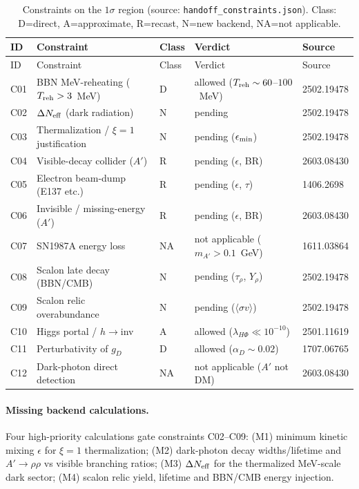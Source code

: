 \documentclass[11pt]{article}
\newcommand{\gD}{g_D}
\newcommand{\mAp}{m_{A'}}
\begin{document}
\begin{longtable}{l p{} l l p{}}
\caption{Constraints on the $1\sigma$ region (source:
\texttt{handoff\_constraints.json}). Class: D=direct, A=approximate, R=recast,
N=new backend, NA=not applicable.}
\label{tab:constraints}\\
\toprule
ID & Constraint & Class & Verdict & Source \\
\midrule
\endfirsthead
\toprule
ID & Constraint & Class & Verdict & Source \\
\midrule
\endhead
C01 & BBN MeV-reheating ($T_{\rm reh}>3$~MeV) & D & allowed ($T_{\rm reh}\sim60$--$100$~MeV) & 2502.19478 \\
C02 & $\Delta N_{\rm eff}$ (dark radiation) & N & pending & 2502.19478 \\
C03 & Thermalization / $\xi=1$ justification & N & pending ($\epsilon_{\rm min}$) & 2502.19478 \\
C04 & Visible-decay collider ($A'$) & R & pending ($\epsilon$, BR) & 2603.08430 \\
C05 & Electron beam-dump (E137 etc.) & R & pending ($\epsilon$, $\tau$) & 1406.2698 \\
C06 & Invisible / missing-energy ($A'$) & R & pending ($\epsilon$, BR) & 2603.08430 \\
C07 & SN1987A energy loss & NA & not applicable ($\mAp>0.1$~GeV) & 1611.03864 \\
C08 & Scalon late decay (BBN/CMB) & N & pending ($\tau_\rho$, $Y_\rho$) & 2502.19478 \\
C09 & Scalon relic overabundance & N & pending ($\langle\sigma v\rangle$) & 2502.19478 \\
C10 & Higgs portal / $h\to$inv & A & allowed ($\lambda_{H\Phi}\ll10^{-10}$) & 2501.11619 \\
C11 & Perturbativity of $\gD$ & D & allowed ($\alpha_D\sim0.02$) & 1707.06765 \\
C12 & Dark-photon direct detection & NA & not applicable ($A'$ not DM) & 2603.08430 \\
\bottomrule
\end{longtable}

\paragraph{Missing backend calculations.} Four high-priority calculations gate
constraints C02--C09: (M1) minimum kinetic mixing $\epsilon$ for $\xi=1$
thermalization; (M2) dark-photon decay widths/lifetime and
$A'\to\rho\rho$ vs visible branching ratios; (M3) $\Delta N_{\rm eff}$ for the
thermalized MeV-scale dark sector; (M4) scalon relic yield, lifetime and
BBN/CMB energy injection.
\end{document}
